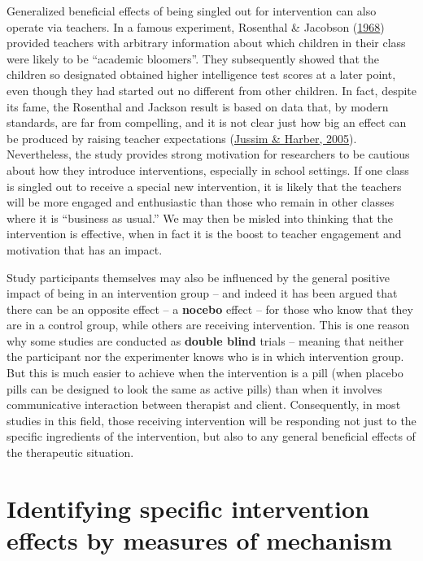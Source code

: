 \documentclass{krantz}
\begin{document}
Generalized beneficial effects of being singled out for intervention can also operate via teachers. In a famous experiment, Rosenthal \& Jacobson (\protect\hyperlink{ref-rosenthal1968}{1968})  provided teachers with arbitrary information about which children in their class were likely to be ``academic bloomers''. They subsequently showed that the children so designated obtained higher intelligence test scores at a later point, even though they had started out no different from other children. In fact, despite its fame, the Rosenthal and Jackson result is based on data that, by modern standards, are far from compelling, and it is not clear just how big an effect can be produced by raising teacher expectations (\protect\hyperlink{ref-jussim2005}{Jussim \& Harber, 2005}). Nevertheless, the study provides strong motivation for researchers to be cautious about how they introduce interventions, especially in school settings. If one class is singled out to receive a special new intervention, it is likely that the teachers will be more engaged and enthusiastic than those who remain in other classes where it is ``business as usual.'' We may then be misled into thinking that the intervention is effective, when in fact it is the boost to teacher engagement and motivation that has an impact.

Study participants themselves may also be influenced by the general positive impact of being in an intervention group -- and indeed it has been argued that there can be an opposite effect -- a \textbf{nocebo} effect -- for those who know that they are in a control group, while others are receiving intervention. This is one reason why some studies are conducted as \textbf{double blind} trials -- meaning that neither the participant nor the experimenter knows who is in which intervention group. But this is much easier to achieve when the intervention is a pill (when placebo pills can be designed to look the same as active pills) than when it involves communicative interaction between therapist and client. Consequently, in most studies in this field, those receiving intervention will be responding not just to the specific ingredients of the intervention, but also to any general beneficial effects of the therapeutic situation.

\hypertarget{identifying-specific-intervention-effects-by-measures-of-mechanism}{%
\section{Identifying specific intervention effects by measures of mechanism}\label{identifying-specific-intervention-effects-by-measures-of-mechanism}}
\end{document}
